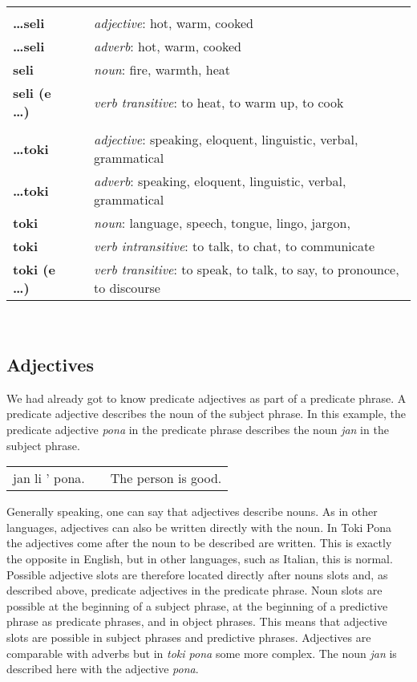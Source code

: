 \begin{supertabular}{p{2,5cm}|ll}
 && \\ %
\textbf{\dots seli} && \textit{adjective}: hot, warm, cooked \\ %
\textbf{\dots seli} && \textit{adverb}: hot, warm, cooked \\ %
\textbf{seli} && \textit{noun}: fire, warmth, heat \\ %
\textbf{seli (e \dots)} && \textit{verb transitive}: to heat, to warm up, to cook \\ %
 && \\ %
\textbf{\dots toki} && \textit{adjective}: speaking, eloquent, linguistic, verbal, grammatical \\ %
\textbf{\dots toki} && \textit{adverb}: speaking, eloquent, linguistic, verbal, grammatical \\ %
\textbf{toki} && \textit{noun}: language, speech, tongue, lingo, jargon, \\ %
\textbf{toki} && \textit{verb intransitive}: to talk, to chat, to communicate \\ %
\textbf{toki (e \dots)} && \textit{verb transitive}: to speak, to talk, to say, to pronounce, to discourse \\ %
\end{supertabular} \\
% 
\newpage
{}
\subsection*{Adjectives}

We had already got to know predicate adjectives as part of a predicate phrase. 
A predicate adjective describes the noun of the subject phrase.
In this example, the predicate adjective \textit{pona} in the predicate phrase describes the noun \textit{jan} in the subject phrase.

\begin{supertabular}{p{5,5cm}|ll}
jan li ' pona. &&  The person is good. \\
\end{supertabular} 

Generally speaking, one can say that adjectives describe nouns. 
As in other languages, adjectives can also be written directly with the noun. 
In Toki Pona the adjectives come after the noun to be described are written. 
This is exactly the opposite in English, but in other languages, such as Italian, this is normal.
Possible adjective slots are therefore located directly after nouns slots and, as described above, predicate adjectives in the predicate phrase. 
Noun slots are possible at the beginning of a subject phrase, at the beginning of a predictive phrase as predicate phrases, and in object phrases. 
This means that adjective slots are possible in subject phrases and predictive phrases.
Adjectives are comparable with adverbs but in \textit{toki pona} some more complex.
The noun \textit{jan} is described here with the adjective \textit{pona}.

